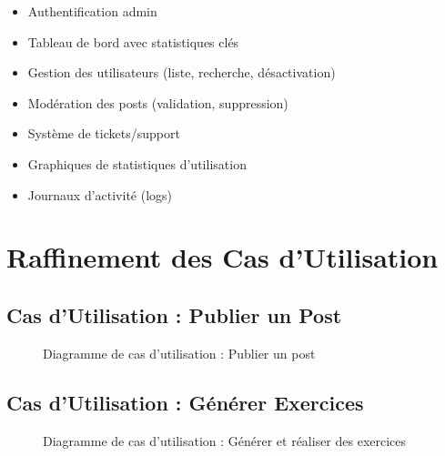 \begin{itemize}
    \item Authentification admin
    \item Tableau de bord avec statistiques clés
    \item Gestion des utilisateurs (liste, recherche, désactivation)
    \item Modération des posts (validation, suppression)
    \item Système de tickets/support
    \item Graphiques de statistiques d'utilisation
    \item Journaux d'activité (logs)
\end{itemize}

\section{Raffinement des Cas d'Utilisation}

\subsection{Cas d'Utilisation : Publier un Post}

\begin{figure}[H]
    \centering
    \caption{Diagramme de cas d'utilisation : Publier un post}
    \label{fig:uc-post}
\end{figure}

\subsection{Cas d'Utilisation : Générer Exercices}

\begin{figure}[H]
    \centering
    \caption{Diagramme de cas d'utilisation : Générer et réaliser des exercices}
    \label{fig:uc-exercices}
\end{figure}

